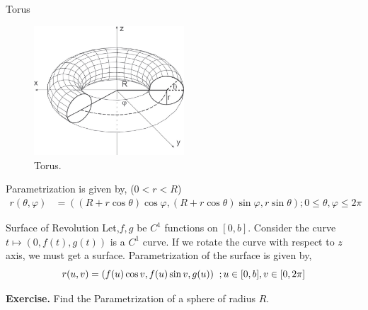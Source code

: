 \documentclass[../Analysis-3]{subfiles}
\begin{document}
\begin{Eg}{Torus}{}
    \begin{figure}[H]
        \centering
        \includegraphics[width=0.5\textwidth]{../figures/lec-24.3.png}
        \caption{Torus.}
    \end{figure}

    Parametrization is given by, ($0<r<R$)
    \begin{align} \label{eq:5}
        r(\theta, \varphi) & = ((R+r\cos \theta)\cos \varphi,(R+r\cos \theta)\sin \varphi, r \sin \theta) ; 0\le \theta, \varphi \le 2\pi
    \end{align}
\end{Eg}

\begin{Eg}{Surface of Revolution}{}
    Let,$f,g$ be $C^1$ functions on $[0,b]$. Consider the curve $t \mapsto (0,f(t),g(t))$ is a $C^1$ curve. If we rotate the curve with respect to $z$ axis, we must get a surface. Parametrization  of the surface is given by,
    \[r(u,v) = (f(u)\cos v,f(u)\sin v,g(u)) \hspace{0.2cm}; u \in [0,b], v \in [0,2\pi] \]
\end{Eg}

\hspace*{0.5cm} \textbf{Exercise.} Find the Parametrization of a sphere of radius $R$.
\end{document}
